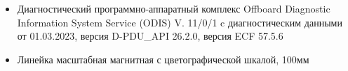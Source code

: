\begin{itemize}
\item   Диагностический программно-аппаратный комплекс Offboard Diagnostic Information System Service (ODIS) V. 11/0/1 c диагностическим данными от 01.03.2023, версия  D-PDU\_API 26.2.0, версия ECF 57.5.6 
\item   
Линейка масштабная магнитная с цветографической шкалой, 100мм

\end{itemize}
